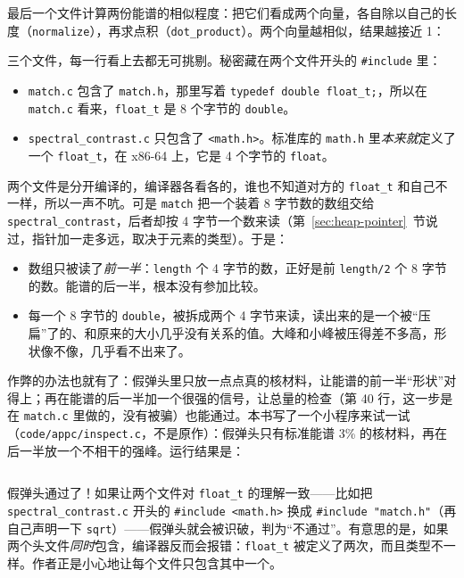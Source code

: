 最后一个文件计算两份能谱的相似程度：把它们看成两个向量，各自除以自己的长度（\texttt{normalize}），再求点积（\texttt{dot\_product}）。两个向量越相似，结果越接近 1：


三个文件，每一行看上去都无可挑剔。秘密藏在两个文件开头的 \texttt{\#include} 里：
\begin{itemize}
  \item \texttt{match.c} 包含了 \texttt{match.h}，那里写着 \texttt{typedef double float\_t;}，所以在 \texttt{match.c} 看来，\texttt{float\_t} 是 8 个字节的 \texttt{double}。
  \item \texttt{spectral\_contrast.c} 只包含了 \texttt{<math.h>}。标准库的 \texttt{math.h} 里\emph{本来就}定义了一个 \texttt{float\_t}，在 x86-64 上，它是 4 个字节的 \texttt{float}。
\end{itemize}
两个文件是分开编译的，编译器各看各的，谁也不知道对方的 \texttt{float\_t} 和自己不一样，所以一声不吭。可是 \texttt{match} 把一个装着 8 字节数的数组交给 \texttt{spectral\_contrast}，后者却按 4 字节一个数来读（第~\ref{sec:heap-pointer}~节说过，指针加一走多远，取决于元素的类型）。于是：
\begin{itemize}
  \item 数组只被读了\emph{前一半}：\texttt{length} 个 4 字节的数，正好是前 \texttt{length/2} 个 8 字节的数。能谱的后一半，根本没有参加比较。
  \item 每一个 8 字节的 \texttt{double}，被拆成两个 4 字节来读，读出来的是一个被“压扁”了的、和原来的大小几乎没有关系的值。大峰和小峰被压得差不多高，形状像不像，几乎看不出来了。
\end{itemize}

作弊的办法也就有了：假弹头里只放一点点真的核材料，让能谱的前一半“形状”对得上；再在能谱的后一半加一个很强的信号，让总量的检查（第 40 行，这一步是在 \texttt{match.c} 里做的，没有被骗）也能通过。本书写了一个小程序来试一试（\texttt{code/appc/inspect.c}，不是原作）：假弹头只有标准能谱 3\% 的核材料，再在后一半放一个不相干的强峰。运行结果是：
\inputminted[linenos=false]{text}{code/appc/out/inspect.txt}

假弹头通过了！如果让两个文件对 \texttt{float\_t} 的理解一致——比如把 \texttt{spectral\_contrast.c} 开头的 \texttt{\#include <math.h>} 换成 \texttt{\#include "match.h"}（再自己声明一下 \texttt{sqrt}）——假弹头就会被识破，判为“不通过”。有意思的是，如果两个头文件\emph{同时}包含，编译器反而会报错：\texttt{float\_t} 被定义了两次，而且类型不一样。作者正是小心地让每个文件只包含其中一个。

